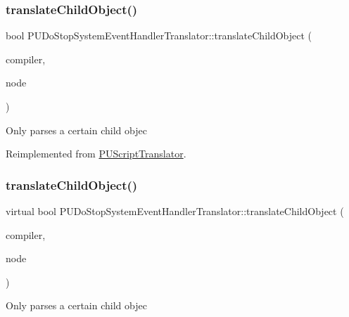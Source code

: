 \subsubsection{\texorpdfstring{translate\+Child\+Object()}{translateChildObject()}\hspace{0.1cm}{\footnotesize\ttfamily [1/2]}}
{\footnotesize\ttfamily bool P\+U\+Do\+Stop\+System\+Event\+Handler\+Translator\+::translate\+Child\+Object (\begin{DoxyParamCaption}\item[{\hyperlink{classPUScriptCompiler}{P\+U\+Script\+Compiler} $\ast$}]{compiler,  }\item[{\hyperlink{classPUAbstractNode}{P\+U\+Abstract\+Node} $\ast$}]{node }\end{DoxyParamCaption})\hspace{0.3cm}{\ttfamily [virtual]}}

Only parses a certain child objec 

Reimplemented from \hyperlink{classPUScriptTranslator_ab587d01348ae3e678cb700c719b2b113}{P\+U\+Script\+Translator}.

\mbox{\label{classPUDoStopSystemEventHandlerTranslator_a144c0a82b9956f00b3d718ac0b9c79cc}} 
\subsubsection{\texorpdfstring{translate\+Child\+Object()}{translateChildObject()}\hspace{0.1cm}{\footnotesize\ttfamily [2/2]}}
{\footnotesize\ttfamily virtual bool P\+U\+Do\+Stop\+System\+Event\+Handler\+Translator\+::translate\+Child\+Object (\begin{DoxyParamCaption}\item[{\hyperlink{classPUScriptCompiler}{P\+U\+Script\+Compiler} $\ast$}]{compiler,  }\item[{\hyperlink{classPUAbstractNode}{P\+U\+Abstract\+Node} $\ast$}]{node }\end{DoxyParamCaption})\hspace{0.3cm}{\ttfamily [virtual]}}

Only parses a certain child objec 

